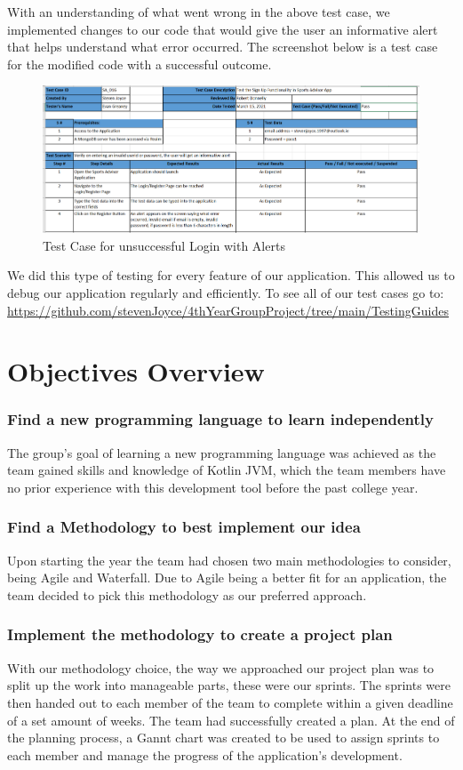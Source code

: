 With an understanding of what went wrong in the above test case, we implemented changes to our code that would give the user an informative alert that helps understand what error occurred. The screenshot below is a test case for the modified code with a successful outcome.
\begin{figure}[H]
    \centering
    \includegraphics[width=15cm, height = 6.5 cm]{img/testCaseSignInError.PNG}
    \caption{Test Case for unsuccessful Login with Alerts}
    \label{fig:altas config}
\end{figure}
We did this type of testing for every feature of our application. This allowed us to debug our application regularly and efficiently. To see all of our test cases go to:  \url{https://github.com/stevenJoyce/4thYearGroupProject/tree/main/TestingGuides}
\section{Objectives Overview}
\subsubsection{Find a new programming language to learn independently}
The group's goal of learning a new programming language was achieved as the team gained skills and knowledge of Kotlin JVM, which the team members have no prior experience with this development tool before the past college year.
\subsubsection {Find a Methodology to best implement our idea}
Upon starting the year the team had chosen two main methodologies to consider, being Agile and Waterfall. Due to Agile being a better fit for an application, the team decided to pick this methodology as our preferred approach.
\subsubsection {Implement the methodology to create a project plan}
With our methodology choice, the way we approached our project plan was to split up the work into manageable parts, these were our sprints. The sprints were then handed out to each member of the team to complete within a given deadline of a set amount of weeks. The team had successfully created a plan. At the end of the planning process, a Gannt chart was created to be used to assign sprints to each member and manage the progress of the application's development.
